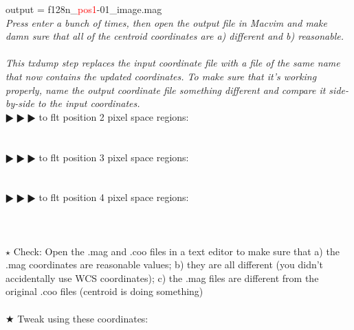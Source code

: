 \documentclass[11pt,obeyspaces]{article} %
\begin{document}
\begin{shaded}
output = {f128n\_\textcolor{red}{pos1}-01\_image.mag} \\
\textit{Press enter a bunch of times, then open the output file in Macvim and make damn sure that all of the centroid coordinates are a) different and b) reasonable.}\\ 
\textcolor{red}{}\textcolor{red}{} \\ 
\textit{This txdump step replaces the input coordinate file with a file of the same name that now contains the updated coordinates. To make sure that it's working properly, name the output coordinate file something different and compare it side-by-side to the input coordinates.} \\
$\RHD \RHD \RHD$ to flt position 2 pixel space regions: \\
  \\ 
\textcolor{red}{}\textcolor{red}{} \\ 
$\RHD \RHD \RHD$ to flt position 3 pixel space regions: \\
  \\
\textcolor{red}{}\textcolor{red}{} \\ 
$\RHD \RHD \RHD$ to flt position 4 pixel space regions: \\
  \\ 
\textcolor{red}{}\textcolor{red}{} \\ \\
$\star$ Check: Open the .mag and .coo files in a text editor to make sure that a) the .mag coordinates are reasonable values; b) they are all different (you didn't accidentally use WCS coordinates); c) the .mag files are different from the original .coo files (centroid is doing something) \\ \\
$\bigstar$ Tweak using these coordinates: \\
\textcolor{red}{}\textcolor{red}{}\textcolor{red}{}\textcolor{red}{}\textcolor{red}{}\textcolor{red}{}\textcolor{red}{}\textcolor{red}{}\textcolor{red}{}\textcolor{red}{}\textcolor{red}{} \\ 

\end{shaded}
\end{document}
